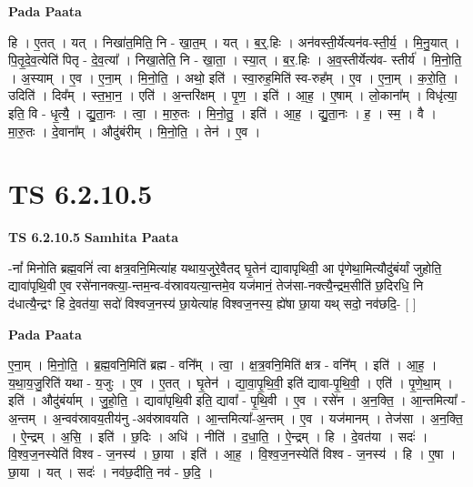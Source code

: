 \documentclass[17pt]{extarticle}
\begin{document}
\textbf{Pada Paata} \newline

हि । ए॒तत् । यत् । निखा॑त॒मिति॒ नि - खा॒त॒म् । यत् । ब॒र्॒.हिः । अन॑वस्ती॒र्येत्यन॑व-स्ती॒र्य॒ । मि॒नु॒यात् । पि॒तृ॒दे॒व॒त्येति॑ पितृ - दे॒व॒त्या᳚ । निखा॒तेति॒ नि - खा॒ता॒ । स्या॒त् । ब॒र॒.हिः । अ॒व॒स्तीर्येत्य॑व- स्तीर्य॑ । मि॒नो॒ति॒ । अ॒स्याम् । ए॒व । ए॒ना॒म् । मि॒नो॒ति॒ । अथो॒ इति॑ । स्वा॒रुह॒मिति॑ स्व-रुह᳚म् । ए॒व । ए॒ना॒म् । क॒रो॒ति॒ । उदिति॑ । दिव᳚म् । स्त॒भा॒न॒ । एति॑ । अ॒न्तरि॑क्षम् । पृ॒ण॒ । इति॑ । आ॒ह॒ । ए॒षाम् । लो॒काना᳚म् । विधृ॑त्या॒ इति॒ वि - धृ॒त्यै॒ । द्यु॒ता॒नः । त्वा॒ । मा॒रु॒तः । मि॒नो॒तु॒ । इति॑ । आ॒ह॒ । द्यु॒ता॒नः । ह॒ । स्म॒ । वै । मा॒रु॒तः । दे॒वाना᳚म् । औदु॑बंरीम् । मि॒नो॒ति॒ । तेन॑ । ए॒व ।  \newline




\section*{ TS 6.2.10.5 }

\textbf{TS 6.2.10.5 } \newline
\textbf{Samhita Paata} \newline

-नां᳚ मिनोति ब्रह्म॒वनिं॑ त्वा क्षत्र॒वनि॒मित्या॑ह यथाय॒जुरे॒वैतद् घृ॒तेन॑ द्यावापृथिवी॒ आ पृ॑णेथा॒मित्यौदु॑बंर्यां जुहोति॒ द्यावा॑पृथि॒वी ए॒व रसे॑नानक्त्या॒-न्तम॒न्व-व॑स्रावयत्या॒न्तमे॒व यज॑मानं॒ तेज॑सा-नक्त्यै॒न्द्रम॒सीति॑ छ॒दिरधि॒ नि द॑धात्यै॒न्द्रꣳ हि दे॒वत॑या॒ सदो॑ विश्वज॒नस्य॑ छा॒येत्या॑ह विश्वज॒नस्य॒ ह्ये॑षा छा॒या यथ् सदो॒ नव॑छदि॒- [  ] \newline

\textbf{Pada Paata} \newline

ए॒ना॒म् । मि॒नो॒ति॒ । ब्र॒ह्म॒वनि॒मिति॑ ब्रह्म - वनि᳚म् । त्वा॒ । क्ष॒त्र॒वनि॒मिति॑ क्षत्र - वनि᳚म् । इति॑ । आ॒ह॒ । य॒था॒य॒जु॒रिति॑ यथा - य॒जुः । ए॒व । ए॒तत् । घृ॒तेन॑ । द्या॒वा॒पृ॒थि॒वी॒ इति॑ द्यावा-पृ॒थि॒वी॒ । एति॑ । पृ॒णे॒था॒म् । इति॑ । औदु॑बंर्याम् । जु॒हो॒ति॒ । द्यावा॑पृथि॒वी इति॒ द्यावा᳚ - पृ॒थि॒वी । ए॒व । रसे॑न । अ॒न॒क्ति॒ । आ॒न्तमित्या᳚ - अ॒न्तम् । अ॒न्वव॑स्रावय॒तीय॑नु -अव॑स्रावयति । आ॒न्तमित्या᳚-अ॒न्तम् । ए॒व । यज॑मानम् । तेज॑सा । अ॒न॒क्ति॒ । ऐ॒न्द्रम् । अ॒सि॒ । इति॑ । छ॒दिः । अधि॑ । नीति॑ । द॒धा॒ति॒ । ऐ॒न्द्रम् । हि । दे॒वत॑या । सदः॑ । वि॒श्व॒ज॒नस्येति॑ विश्व - ज॒नस्य॑ । छा॒या । इति॑ । आ॒ह॒ । वि॒श्व॒ज॒नस्येति॑ विश्व - ज॒नस्य॑ । हि । ए॒षा । छा॒या । यत् । सदः॑ । नव॑छ॒दीति॒ नव॑ - छ॒दि॒ ।  \newline
\end{document}
